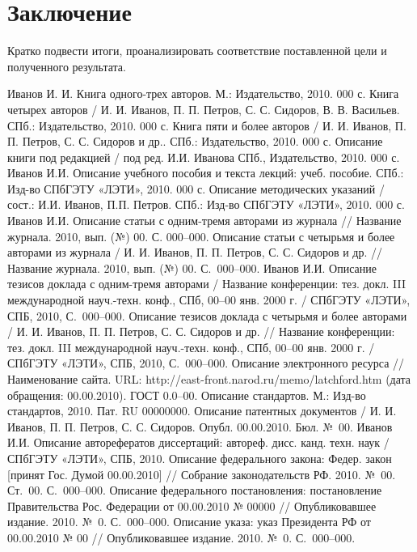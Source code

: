 \newpage
\section*{Заключение}
Кратко подвести итоги, проанализировать соответствие поставленной цели и полученного результата.

\newpage

\begin{thebibliography}{99}
	\bibitem{} Иванов И. И. Книга одного-трех авторов. М.: Издательство, 2010. 000 с.
	\bibitem{} Книга четырех авторов / И. И. Иванов, П. П. Петров, С. С. Сидоров, В. В. Васильев. СПб.: Издательство, 2010. 000 с.
	\bibitem{} Книга пяти и более авторов / И. И. Иванов, П. П. Петров, С. С. Сидоров и др.. СПб.: Издательство, 2010. 000 с.
	\bibitem{} Описание книги под редакцией / под ред. И.И. Иванова СПб., Издательство, 2010. 000 с.
	\bibitem{} Иванов И.И. Описание учебного пособия и текста лекций: учеб. пособие. СПб.: Изд-во СПбГЭТУ «ЛЭТИ», 2010. 000 с.
	\bibitem{} Описание методических указаний / сост.: И.И. Иванов, П.П. Петров. СПб.: Изд-во СПбГЭТУ «ЛЭТИ», 2010. 000 с.
	\bibitem{} Иванов И.И. Описание статьи с одним-тремя авторами из журнала // Название журнала. 2010, вып. (№) 00. С. 000–000.
	\bibitem{} Описание статьи с четырьмя и более авторами из журнала / И. И. Иванов, П. П. Петров, С. С. Сидоров и др. // Название журнала. 2010, вып. (№) 00. С. 000–000.
	\bibitem{} Иванов И.И. Описание тезисов доклада с одним-тремя авторами / Название конференции: тез. докл. III международной науч.-техн. конф., СПб,  00–00 янв. 2000 г. / СПбГЭТУ «ЛЭТИ», СПБ, 2010, С. 000–000.
	\bibitem{} Описание тезисов доклада с четырьмя и более авторами / И. И. Иванов, П. П. Петров, С. С. Сидоров и др. // Название конференции: тез. докл. III международной науч.-техн. конф., СПб,  00–00 янв. 2000 г. / СПбГЭТУ «ЛЭТИ», СПБ, 2010, С. 000–000.
	\bibitem{} Описание электронного ресурса // Наименование сайта. URL: http://east-front.narod.ru/memo/latchford.htm (дата обращения: 00.00.2010).
	\bibitem{} ГОСТ 0.0–00. Описание стандартов. М.: Изд-во стандартов, 2010.
	\bibitem{} Пат. RU 00000000. Описание патентных документов / И. И. Иванов, П. П. Петров, С. С. Сидоров. Опубл. 00.00.2010. Бюл. № 00.
	\bibitem{} Иванов И.И. Описание авторефератов диссертаций: автореф. дисс. канд. техн. наук / СПбГЭТУ «ЛЭТИ», СПБ, 2010.
	\bibitem{} Описание федерального закона: Федер. закон [принят Гос. Думой 00.00.2010] // Собрание законодательств РФ. 2010. № 00. Ст. 00. С. 000–000.
	\bibitem{} Описание федерального постановления: постановление Правительства Рос. Федерации от 00.00.2010 № 00000 // Опубликовавшее издание. 2010. № 0. С. 000–000.
	\bibitem{} Описание указа: указ Президента РФ от 00.00.2010 № 00 // Опубликовавшее издание. 2010. № 0. С. 000–000.
\end{thebibliography}

